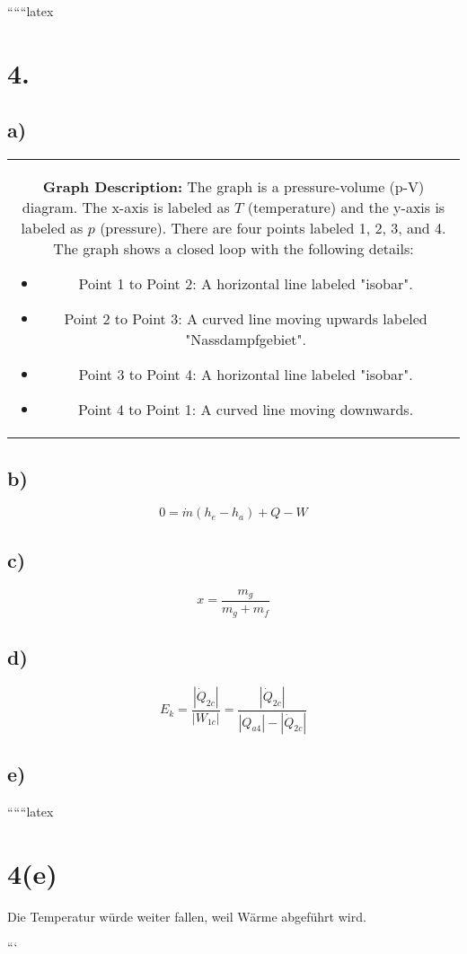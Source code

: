 
``````latex


\section*{4.}

\subsection*{a)}

\begin{center}
\begin{tabular}{c}
\begin{minipage}{0.8\textwidth}
\textbf{Graph Description:} The graph is a pressure-volume (p-V) diagram. The x-axis is labeled as $T$ (temperature) and the y-axis is labeled as $p$ (pressure). There are four points labeled 1, 2, 3, and 4. The graph shows a closed loop with the following details:
\begin{itemize}
    \item Point 1 to Point 2: A horizontal line labeled "isobar".
    \item Point 2 to Point 3: A curved line moving upwards labeled "Nassdampfgebiet".
    \item Point 3 to Point 4: A horizontal line labeled "isobar".
    \item Point 4 to Point 1: A curved line moving downwards.
\end{itemize}
\end{minipage}
\end{tabular}
\end{center}

\subsection*{b)}

\[
0 = \dot{m} (h_e - h_a) + Q - W
\]

\subsection*{c)}

\[
x = \frac{m_g}{m_g + m_f}
\]

\subsection*{d)}

\[
E_k = \frac{|\dot{Q}_{2c}|}{|W_{1c}|} = \frac{|\dot{Q}_{2c}|}{|Q_{a4}| - |\dot{Q}_{2c}|}
\]

\subsection*{e)}

``````latex

\section*{4(e)}
Die Temperatur würde weiter fallen, weil Wärme abgeführt wird.

```
